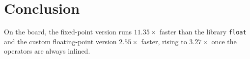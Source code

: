 \documentclass[10pt,a4paper]{article}
\begin{document}
\section{Conclusion}

On the board, the fixed-point version runs $\mathbf{11.35\times}$ faster than the library
\texttt{float} and the custom floating-point version $\mathbf{2.55\times}$ faster, rising to
$\mathbf{3.27\times}$ once the operators are always inlined.
\end{document}
